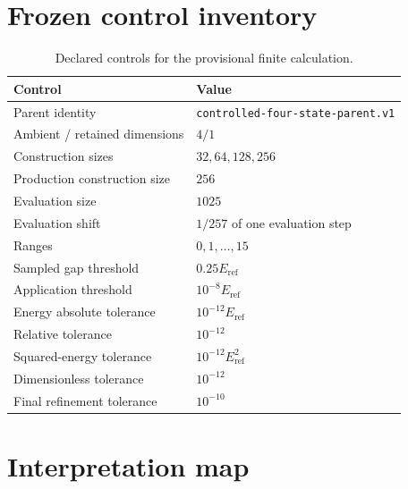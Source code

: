 \documentclass[11pt]{article}
\newcommand{\eref}{E_{\mathrm{ref}}}
\newcommand{\code}[1]{\texttt{#1}}
\begin{document}
\appendix

\section{Frozen control inventory}

\begin{table}[htbp]
\centering
\caption{Declared controls for the provisional finite calculation.}
\begin{tabular}{ll}
\toprule
Control & Value \\
\midrule
Parent identity & \code{controlled-four-state-parent.v1} \\
Ambient / retained dimensions & $4/1$ \\
Construction sizes & $32,64,128,256$ \\
Production construction size & $256$ \\
Evaluation size & $1025$ \\
Evaluation shift & $1/257$ of one evaluation step \\
Ranges & $0,1,\ldots,15$ \\
Sampled gap threshold & $0.25\eref$ \\
Application threshold & $10^{-8}\eref$ \\
Energy absolute tolerance & $10^{-12}\eref$ \\
Relative tolerance & $10^{-12}$ \\
Squared-energy tolerance & $10^{-12}\eref^2$ \\
Dimensionless tolerance & $10^{-12}$ \\
Final refinement tolerance & $10^{-10}$ \\
\bottomrule
\end{tabular}
\end{table}

\section{Interpretation map}
\end{document}
